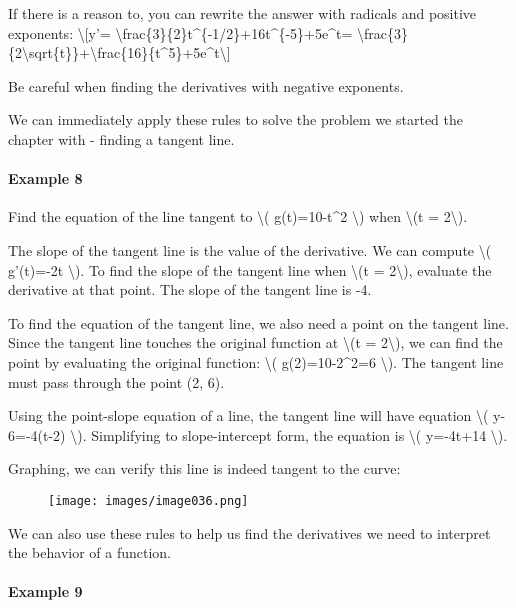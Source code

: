 If there is a reason to, you can rewrite the answer with radicals and
positive exponents: \textbackslash{}{[}y'=
\textbackslash{}frac\{3\}\{2\}t\^{}\{-1/2\}+16t\^{}\{-5\}+5e\^{}t=
\textbackslash{}frac\{3\}\{2\textbackslash{}sqrt\{t\}\}+\textbackslash{}frac\{16\}\{t\^{}5\}+5e\^{}t\textbackslash{}{]}

Be careful when finding the derivatives with negative exponents.

We can immediately apply these rules to solve the problem we started the
chapter with - finding a tangent line.

\hypertarget{example-8}{%
\paragraph{Example 8}\label{example-8}}

Find the equation of the line tangent to \textbackslash{}(
g(t)=10-t\^{}2 \textbackslash{}) when \textbackslash{}(t =
2\textbackslash{}).

The slope of the tangent line is the value of the derivative. We can
compute \textbackslash{}( g'(t)=-2t \textbackslash{}). To find the slope
of the tangent line when \textbackslash{}(t = 2\textbackslash{}),
evaluate the derivative at that point. The slope of the tangent line is
-4.

To find the equation of the tangent line, we also need a point on the
tangent line. Since the tangent line touches the original function at
\textbackslash{}(t = 2\textbackslash{}), we can find the point by
evaluating the original function: \textbackslash{}( g(2)=10-2\^{}2=6
\textbackslash{}). The tangent line must pass through the point (2, 6).

Using the point-slope equation of a line, the tangent line will have
equation \textbackslash{}( y-6=-4(t-2) \textbackslash{}). Simplifying to
slope-intercept form, the equation is \textbackslash{}( y=-4t+14
\textbackslash{}).

Graphing, we can verify this line is indeed tangent to the curve:

\begin{figure}
\centering
\texttt{[image: images/image036.png]}
\caption{}
\end{figure}

We can also use these rules to help us find the derivatives we need to
interpret the behavior of a function.

\hypertarget{example-9}{%
\paragraph{Example 9}\label{example-9}}

